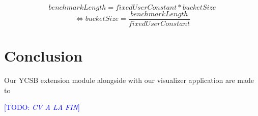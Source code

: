 \documentclass[a4paper,11pt]{report}
\newcommand*{\todo}[1]{\textcolor{blue}{[TODO: \emph{#1}]}}
\begin{document}
$$ benchmarkLength = fixedUserConstant * bucketSize $$
$$\Longleftrightarrow bucketSize = \frac{benchmarkLength}{fixedUserConstant} $$

\clearpage

\chapter*{Conclusion}

Our YCSB extension module alongside with our visualizer application are made to

\todo{CV A LA FIN}
\clearpage




\clearpage



\newpage

\end{document}
